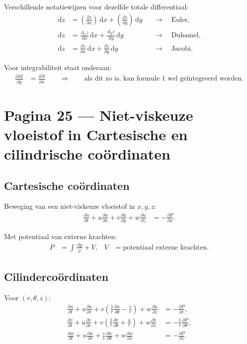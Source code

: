 \documentclass[11pt]{article}
\newcommand{\dd}{\,\mathrm{d}}
\newcommand{\pd}[2]{\frac{\partial #1}{\partial #2}}
\begin{document}
Verschillende notatiewijzen voor dezelfde totale differentiaal:
\begin{align*}
\dd z
  &=
  \left(\pd{z}{x}\right)\dd x
  +
  \left(\pd{z}{y}\right)\dd y
  &&\rightarrow\quad \text{Euler},
\\
\dd z
  &=
  \frac{\dd_x z}{\dd x}\dd x
  +
  \frac{\dd_y z}{\dd y}\dd y
  &&\rightarrow\quad \text{Duhamel},
\\
\dd z
  &=
  \frac{\partial z}{\partial x}\dd x
  +
  \frac{\partial z}{\partial y}\dd y
  &&\rightarrow\quad \text{Jacobi}.
\end{align*}

Voor integrabiliteit staat onderaan:
\begin{align*}
\pd{M}{y}
  &=
  \pd{N}{x}
  \qquad
  \Longrightarrow
  \qquad
  \text{als dit zo is, kan formule 1 wel geïntegreerd worden.}
\end{align*}

\newpage

\section*{Pagina 25 --- Niet-viskeuze vloeistof in Cartesische en cilindrische coördinaten}

\subsection*{Cartesische coördinaten}

Beweging van een niet-viskeuze vloeistof in $x,y,z$:
\begin{align*}
\pd{u}{t}
+u\pd{u}{x}
+v\pd{u}{y}
+w\pd{u}{z}
&=
-\pd{P}{x}.
\end{align*}

Met potentiaal van externe krachten:
\begin{align*}
P
  &=
  \int \frac{\dd p}{\rho}+V,
&
V
  &=
  \text{potentiaal externe krachten}.
\end{align*}

\subsection*{Cilindercoördinaten}

Voor $\left(r,\theta,z\right)$:
\begin{align*}
\pd{u}{t}
+u\pd{u}{r}
+v\left(
  \frac{1}{r}\pd{u}{\theta}
  -\frac{v}{r}
 \right)
+w\pd{u}{z}
&=
-\pd{P}{r},
\\
\pd{v}{t}
+u\pd{v}{r}
+v\left(
  \frac{1}{r}\pd{v}{\theta}
  +\frac{u}{r}
 \right)
+w\pd{v}{z}
&=
-\frac{1}{r}\pd{P}{\theta},
\\
\pd{w}{t}
+u\pd{w}{r}
+\frac{v}{r}\pd{w}{\theta}
+w\pd{w}{z}
&=
-\pd{P}{z}.
\end{align*}
\end{document}

